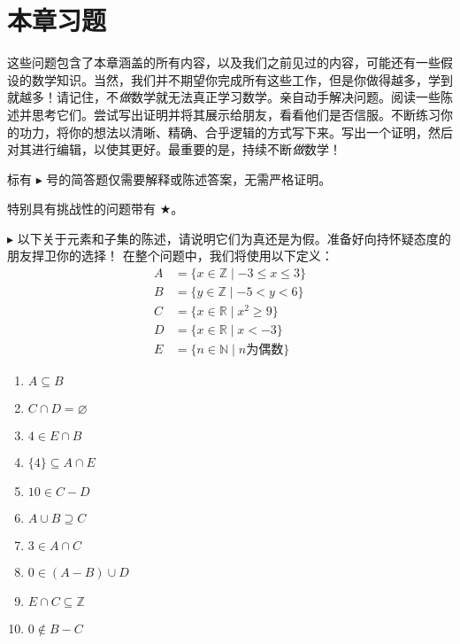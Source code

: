 \section{本章习题}

这些问题包含了本章涵盖的所有内容，以及我们之前见过的内容，可能还有一些假设的数学知识。当然，我们并不期望你完成所有这些工作，但是你做得越多，学到就越多！请记住，不\emph{做}数学就无法真正学习数学。亲自动手解决问题。阅读一些陈述并思考它们。尝试写出证明并将其展示给朋友，看看他们是否信服。不断练习你的功力，将你的想法以清晰、精确、合乎逻辑的方式写下来。写出一个证明，然后对其进行编辑，以使其更好。最重要的是，持续不断\emph{做}数学！

标有 $\blacktriangleright$ 号的简答题仅需要解释或陈述答案，无需严格证明。

特别具有挑战性的问题带有 $\bigstar$。

\begin{exercise}
    $\blacktriangleright$ 以下关于元素和子集的陈述，请说明它们为真还是为假。准备好向持怀疑态度的朋友捍卫你的选择！
    在整个问题中，我们将使用以下定义：
    \begin{align*}
        A &= \{x \in \mathbb{Z} \mid -3 \le x \le 3\} \\
        B &= \{y \in \mathbb{Z} \mid -5 < y < 6\} \\
        C &= \{x \in \mathbb{R} \mid x^2 \ge 9\} \\
	    D &= \{x \in \mathbb{R} \mid x < -3\} \\
        E &= \{n \in \mathbb{N} \mid n \text{为偶数} \}
    \end{align*}
    \begin{enumerate}[label=(\alph*)]
        \item $A \subseteq B$
        \item $C \cap D = \varnothing$
        \item $4 \in E \cap B$
        \item $\{4\} \subseteq A \cap E$
        \item $10 \in C - D$
        \item $A \cup B \supseteq C$
        \item $3 \in A \cap C$
        \item $0 \in (A - B) \cup D$
        \item $E \cap C \subseteq \mathbb{Z}$
        \item $0 \notin B - C$
    \end{enumerate}
\end{exercise}

